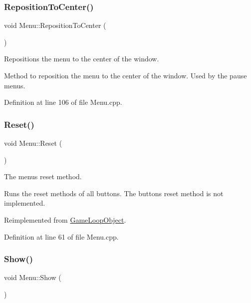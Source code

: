 \subsubsection{\texorpdfstring{Reposition\+To\+Center()}{RepositionToCenter()}}
{\footnotesize\ttfamily void Menu\+::\+Reposition\+To\+Center (\begin{DoxyParamCaption}{ }\end{DoxyParamCaption})}



Repositions the menu to the center of the window. 

Method to reposition the menu to the center of the window. Used by the pause menus. 

Definition at line 106 of file Menu.\+cpp.

\mbox{\label{class_menu_af48862906748cee615d455eae4ee3349}} 
\subsubsection{\texorpdfstring{Reset()}{Reset()}}
{\footnotesize\ttfamily void Menu\+::\+Reset (\begin{DoxyParamCaption}{ }\end{DoxyParamCaption})\hspace{0.3cm}{\ttfamily [virtual]}}



The menu\textquotesingle{}s reset method. 

Runs the reset methods of all buttons. The button\textquotesingle{}s reset method is not implemented. 

Reimplemented from \hyperlink{class_game_loop_object_af61e973be170cb9437a5b7d9ecd6ef53}{Game\+Loop\+Object}.



Definition at line 61 of file Menu.\+cpp.

\mbox{\label{class_menu_a03141d21380b6c72be54edd7aae33ff4}} 
\subsubsection{\texorpdfstring{Show()}{Show()}}
{\footnotesize\ttfamily void Menu\+::\+Show (\begin{DoxyParamCaption}{ }\end{DoxyParamCaption})}



